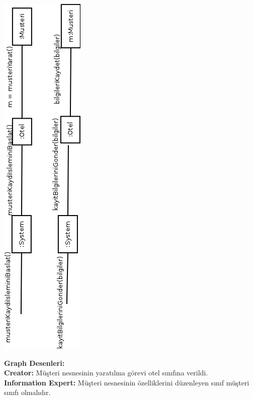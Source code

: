 \documentclass[12pt,a4paper]{report}
\begin{document}
\begin{center}
\includegraphics{dia/eventdiagram-usecase1.png}
\end{center}

\newpage
{\bf Graph Desenleri:}
\\{\bf Creator:} Müşteri nesnesinin yaratılma görevi otel sınıfına verildi.
\\{\bf Information Expert:} Müşteri nesnesinin özelliklerini düzenleyen sınıf müşteri sınıfı olmalıdır.

\newpage
\end{document}
